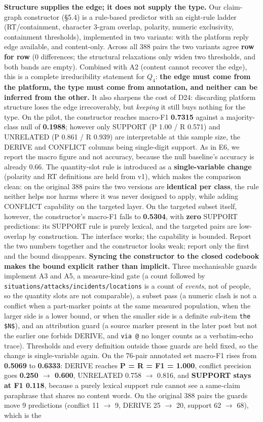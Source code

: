 \textbf{Structure supplies the edge; it does not supply the type.} Our claim-graph constructor (\S5.4) is a rule-based predictor with an eight-rule ladder (RT/containment, character 3-gram overlap, polarity, numeric exclusivity, containment thresholds), implemented in two variants: with the platform reply edge available, and content-only. Across all 388 pairs the two variants agree \textbf{row for row} (0 differences; the structural relaxations only widen two thresholds, and both bands are empty). Combined with A2 (content cannot recover the edge), this is a complete irreducibility statement for $Q_4$: \textbf{the edge must come from the platform, the type must come from annotation, and neither can be inferred from the other.} It also sharpens the cost of D24: discarding platform structure loses the edge irrecoverably, but \emph{keeping} it still buys nothing for the type. On the pilot, the constructor reaches macro-F1 \textbf{0.7315} against a majority-class null of \textbf{0.1988}; however only SUPPORT (P 1.00 / R 0.571) and UNRELATED (P 0.861 / R 0.939) are interpretable at this sample size, the DERIVE and CONFLICT columns being single-digit support. As in E6, we report the macro figure and not accuracy, because the null baseline's accuracy is already 0.66. The quantity-slot rule is introduced as a \textbf{single-variable change} (polarity and RT definitions are held from v1), which makes the comparison clean: on the original 388 pairs the two versions are \textbf{identical per class}, the rule neither helps nor harms where it was never designed to apply, while adding CONFLICT capability on the targeted layer. On the targeted subset itself, however, the constructor's macro-F1 falls to \textbf{0.5304}, with \textbf{zero} SUPPORT predictions: its SUPPORT rule is purely lexical, and the targeted pairs are low-overlap by construction. The interface works; the capability is bounded. Report the two numbers together and the constructor looks weak; report only the first and the bound disappears. \textbf{Syncing the constructor to the closed codebook makes the bound explicit rather than implicit.} Three mechanisable guards implement A3 and A5, a measure-kind gate (a count followed by \texttt{situations/attacks/incidents/locations} is a count of \emph{events}, not of people, so the quantity slots are not comparable), a subset pass (a numeric clash is not a conflict when a part-marker points at the same measured population, when the larger side is a lower bound, or when the smaller side is a definite sub-item \texttt{the \$N\$}), and an attribution guard (a source marker present in the later post but not the earlier one forbids DERIVE, and \texttt{via @} no longer counts as a verbatim-echo trace). Thresholds and every definition outside those guards are held fixed, so the change is single-variable again. On the 76-pair annotated set macro-F1 rises from \textbf{0.5069} to \textbf{0.6333}: DERIVE reaches \textbf{P = R = F1 = 1.000}, conflict precision goes \textbf{0.250 $\to$ 0.600}, UNRELATED 0.758 $\to$ 0.816, and \textbf{SUPPORT stays at F1 0.118}, because a purely lexical support rule cannot see a same-claim paraphrase that shares no content words. On the original 388 pairs the guards move 9 predictions (conflict 11 $\to$ 9, DERIVE 25 $\to$ 20, support 62 $\to$ 68), which is the 